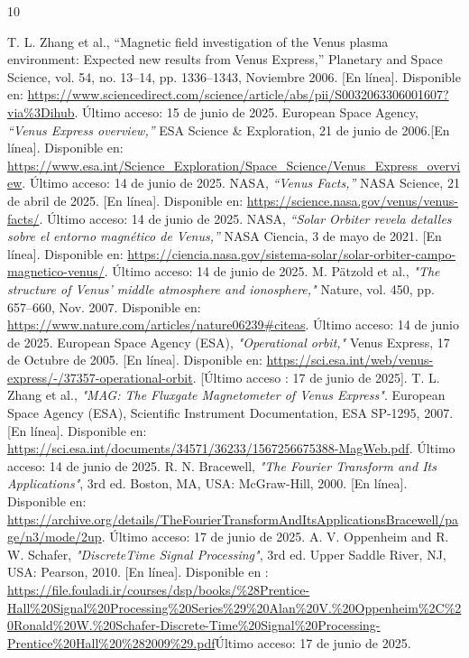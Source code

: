 \documentclass[letterpaper,11pt]{article}
\begin{document}
    \begin{thebibliography}{10}

T. L. Zhang et al., “Magnetic field investigation of the Venus plasma environment: Expected new results from Venus Express,” Planetary and Space Science, vol. 54, no. 13–14, pp. 1336–1343, Noviembre 2006. [En línea]. Disponible en: \url{https://www.sciencedirect.com/science/article/abs/pii/S0032063306001607?via%3Dihub}. Último acceso: 15 de junio de 2025.
 European Space Agency, \textit{“Venus Express overview,”} ESA Science \& Exploration, 21 de junio de 2006.[En línea]. Disponible en: \url{https://www.esa.int/Science_Exploration/Space_Science/Venus_Express_overview}. Último acceso: 14 de junio de 2025.
NASA, \textit{“Venus Facts,”} NASA Science, 21 de abril de 2025. [En línea]. Disponible en: \url{https://science.nasa.gov/venus/venus-facts/}. Último acceso: 14 de junio de 2025.
 NASA, \textit{“Solar Orbiter revela detalles sobre el entorno magnético de Venus,”} NASA Ciencia, 3 de mayo de 2021. [En línea]. Disponible en: \url{https://ciencia.nasa.gov/sistema-solar/solar-orbiter-campo-magnetico-venus/}. Último acceso: 14 de junio de 2025.
 M. Pätzold et al., \textit{"The structure of Venus’ middle atmosphere and ionosphere,"} Nature, vol. 450, pp. 657–660, Nov. 2007. Disponible en: \url{https://www.nature.com/articles/nature06239#citeas}. Último acceso: 14 de junio de 2025.
 European Space Agency (ESA), \textit{"Operational orbit,"} Venus Express, 17 de Octubre de 2005. [En línea]. Disponible en: \url{https://sci.esa.int/web/venus-express/-/37357-operational-orbit}. [Último acceso : 17 de junio de 2025].
 T. L. Zhang et al., \textit{"MAG: The Fluxgate Magnetometer of Venus Express"}. European Space Agency (ESA), Scientific Instrument Documentation, ESA SP-1295, 2007. [En línea]. Disponible en: \url{https://sci.esa.int/documents/34571/36233/1567256675388-MagWeb.pdf}. Último acceso: 14 de junio de 2025.
R. N. Bracewell, \textit{"The Fourier Transform and Its Applications"}, 3rd ed. Boston, MA, USA: McGraw-Hill, 2000.
[En línea]. Disponible en: \url{https://archive.org/details/TheFourierTransformAndItsApplicationsBracewell/page/n3/mode/2up}. Último acceso: 17 de junio de 2025. 
A. V. Oppenheim and R. W. Schafer, \textit{"Discrete\-Time Signal Processing"}, 3rd ed. Upper Saddle River, NJ, USA: Pearson, 2010. [En línea]. Disponible en : \url{https://file.fouladi.ir/courses/dsp/books/%28Prentice-Hall%20Signal%20Processing%20Series%29%20Alan%20V.%20Oppenheim%2C%20Ronald%20W.%20Schafer-Discrete-Time%20Signal%20Processing-Prentice%20Hall%20%282009%29.pdf}Último acceso: 17 de junio de 2025.

\end{thebibliography}
\end{document}
